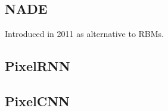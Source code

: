 \documentclass{article}
\begin{document}
\subsection{NADE}

Introduced in 2011 as alternative to RBMs. 

\subsection{PixelRNN} 


\subsection{PixelCNN}  





\end{document}
